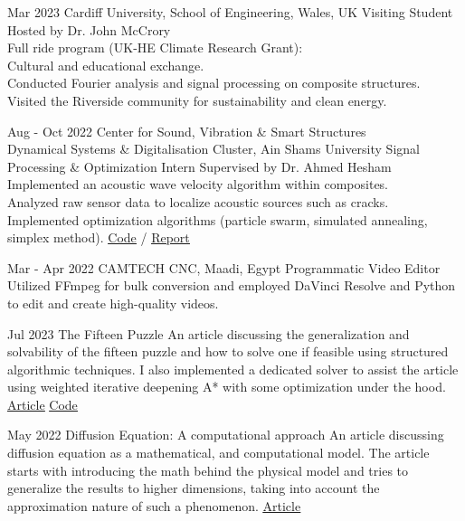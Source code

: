 \documentclass[hidelinks]{report}
\begin{document}
\entry
    {Mar 2023}
    {Cardiff University, School of Engineering, \normalfont Wales, UK}
    {Visiting Student}
    {
      Hosted by Dr. John McCrory \\
      Full ride program (UK-HE Climate Research Grant): \\
      \textbullet Cultural and educational exchange. \\
      \textbullet Conducted Fourier analysis and signal processing on composite structures. \\ 
      \textbullet Visited the Riverside community for sustainability and clean energy. 
    }

\entry
    {Aug - Oct 2022}
    {Center for Sound, Vibration \& Smart Structures \\
      \normalfont Dynamical Systems \& Digitalisation Cluster, Ain Shams University \vspace{1mm}
    }
    {Signal Processing \& Optimization Intern}
    {
      Supervised by Dr. Ahmed Hesham\\
      \textbullet Implemented an acoustic wave velocity algorithm within composites.\\
      \textbullet Analyzed raw sensor data to localize acoustic sources such as cracks. \\
      \textbullet Implemented optimization algorithms (particle swarm, simulated annealing, simplex method).
      \href{\github/AE-software.git}{\underline{Code}} / %
      \href{\github/AE-software/blob/master/Final-Report/Report.pdf}{\underline{Report}}
    }


\entry
    {Mar - Apr 2022}
    {CAMTECH CNC, \normalfont Maadi, Egypt}
    {Programmatic Video Editor}
    {
      Utilized FFmpeg for bulk conversion and employed DaVinci Resolve and Python to edit and create high-quality videos.
    }

\vspace{2mm}
\newpage
{}

\entry
    {Jul 2023}
    {The Fifteen Puzzle}  
    {} 
    {
      An article discussing the generalization and solvability of the fifteen
      puzzle and how to solve one if feasible using structured algorithmic techniques.
      I also implemented a dedicated solver to assist the article using weighted iterative
      deepening A* with some optimization under the hood. \href{\blog/fifteen-puzzle}{\underline{Article}} \textbar
      \href{\github/fifteen-puzzle-solver}{\underline{Code}}
    } 


\entry
    {May 2022}
    {Diffusion Equation: A computational approach}  
    {} 
    {
        An article discussing diffusion equation as a mathematical, and computational
        model. The article starts with introducing the math behind the physical model
        and tries to generalize the results to higher dimensions, taking into account
        the approximation nature of such a phenomenon.
        \href{\blog/diffusion}{\underline{Article}}
    }
\end{document}
